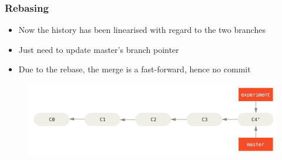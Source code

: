 \documentclass{beamer}
\begin{document}
\begin{frame}
	\frametitle{Rebasing}
	\begin{itemize}
		\item{Now the history has been linearised with regard to the two branches}
		\item{Just need to update master's branch pointer}
		\item{Due to the rebase, the merge is a fast-forward, hence no commit}
	\end{itemize}
	\begin{figure}
		\includegraphics[scale=0.4]{Rebasing-5.png}
	\end{figure}
\end{frame}
\end{document}
